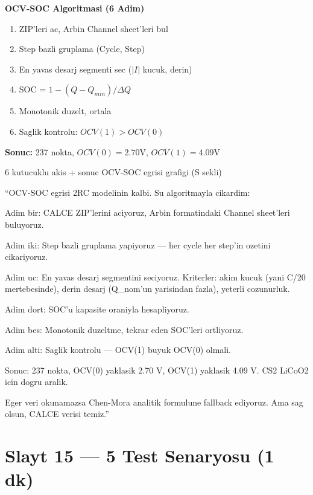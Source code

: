 \documentclass[11pt,a4paper]{article}
\begin{document}
\begin{slytboks}
\textbf{OCV-SOC Algoritmasi (6 Adim)}
\begin{enumerate}
\item ZIP'leri ac, Arbin Channel sheet'leri bul
\item Step bazli gruplama (Cycle, Step)
\item En yavas desarj segmenti sec ($|I|$ kucuk, derin)
\item SOC = $1 - (Q-Q_{min})/\Delta Q$
\item Monotonik duzelt, ortala
\item Saglik kontrolu: $OCV(1) > OCV(0)$
\end{enumerate}
\textbf{Sonuc:} 237 nokta, $OCV(0)=2.70$V, $OCV(1)=4.09$V
\end{slytboks}

\begin{gorselboks}
6 kutucuklu akis + sonuc OCV-SOC egrisi grafigi (S sekli)
\end{gorselboks}

\begin{sayboks}
``OCV-SOC egrisi 2RC modelinin kalbi. Su algoritmayla cikardim:

Adim bir: CALCE ZIP'lerini aciyoruz, Arbin formatindaki Channel sheet'leri buluyoruz.

Adim iki: Step bazli gruplama yapiyoruz --- her cycle her step'in ozetini cikariyoruz.

Adim uc: En yavas desarj segmentini seciyoruz. Kriterler: akim kucuk (yani C/20 mertebesinde), derin desarj (Q\_nom'un yarisindan fazla), yeterli cozunurluk.

Adim dort: SOC'u kapasite oraniyla hesapliyoruz.

Adim bes: Monotonik duzeltme, tekrar eden SOC'leri ortliyoruz.

Adim alti: Saglik kontrolu --- OCV(1) buyuk OCV(0) olmali.

Sonuc: 237 nokta, OCV(0) yaklasik 2.70 V, OCV(1) yaklasik 4.09 V. CS2 LiCoO2 icin dogru aralik.

Eger veri okunamazsa Chen-Mora analitik formulune fallback ediyoruz. Ama sag olsun, CALCE verisi temiz.''
\end{sayboks}

\section{Slayt 15 --- 5 Test Senaryosu (1 dk)}
\end{document}
